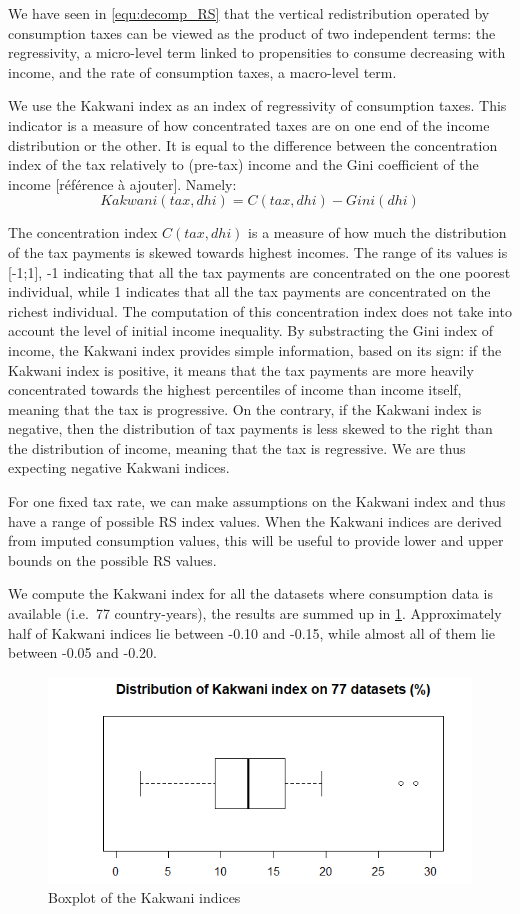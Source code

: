 We have seen in \cref{equ:decomp_RS} that the vertical redistribution operated by consumption taxes can be viewed as the product of two independent terms: the regressivity, a micro-level term linked to propensities to consume decreasing with income, and the rate of consumption taxes, a macro-level term.

We use the Kakwani index as an index of regressivity of consumption taxes. This indicator is a measure of how concentrated taxes are on one end of the income distribution or the other. It is equal to the difference between the concentration index of the tax relatively to (pre-tax) income and the Gini coefficient of the income [référence à ajouter]. Namely:
\[ Kakwani(tax, dhi) = C(tax,dhi) - Gini(dhi) \]

The concentration index $C(tax,dhi)$ is a measure of how much the distribution of the tax payments is skewed towards highest incomes. The range of its values is [-1;1], -1 indicating that all the tax payments are concentrated on the one poorest individual, while 1 indicates that all the tax payments are concentrated on the richest individual. The computation of this concentration index does not take into account the level of initial income inequality. By substracting the Gini index of income, the Kakwani index provides simple information, based on its sign: if the Kakwani index is positive, it means that the tax payments are more heavily concentrated towards the highest percentiles of income than income itself, meaning that the tax is progressive. On the contrary, if the Kakwani index is negative, then the distribution of tax payments is less skewed to the right than the distribution of income, meaning that the tax is regressive. We are thus expecting negative Kakwani indices.

For one fixed tax rate, we can make assumptions on the Kakwani index and thus have a range of possible RS index values. When the Kakwani indices are derived from imputed consumption values, this will be useful to provide lower and upper bounds on the possible RS values.

We compute the Kakwani index for all the datasets where consumption data is available (i.e.\ 77 country-years), the results are summed up in \cref{fig:kakwani_boxplot}. Approximately half of Kakwani indices lie between -0.10 and -0.15, while almost all of them lie between -0.05 and -0.20.
\begin{figure}
    \centering
    \includegraphics{images/boxplot_kakwani.png}
    \caption{Boxplot of the Kakwani indices}
    \label{fig:kakwani_boxplot}
\end{figure}

